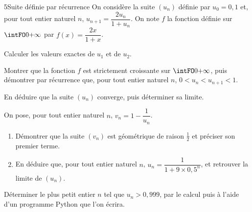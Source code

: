 \begin{exoBac}{5}{Suite définie par récurrence}
On considère la suite $(u_n)$ définie par $u_0=0{,}1$ et, pour tout entier naturel $n$, $u_{n+1}=\dfrac{2u_n}{1+u_n}$. On note $f$ la
fonction définie sur $\intFO0{+\infty}$ par $f(x)=\dfrac{2x}{1+x}$.
\begin{questions}
  \item Calculer les valeurs exactes de $u_1$ et de $u_2$.
  \item Montrer que la fonction $f$ est strictement croissante sur $\intFO0{+\infty}$, puis démontrer par récurrence que, pour tout
    entier naturel $n$, $0<u_n<u_{n+1}<1$.
  \item En déduire que la suite $(u_n)$ converge, puis déterminer sa limite.
  \item On pose, pour tout entier naturel $n$, $v_n=1-\dfrac{1}{u_n}$.
    \begin{enumerate}[label=\alph*),leftmargin=1.4em,itemsep=0.4mm,topsep=0.4mm]
      \item Démontrer que la suite $(v_n)$ est géométrique de raison $\frac12$ et préciser son premier terme.
      \item En déduire que, pour tout entier naturel $n$, $u_n=\dfrac{1}{1+9\times0{,}5^{n}}$, et retrouver la limite de $(u_n)$.
    \end{enumerate}
  \item Déterminer le plus petit entier $n$ tel que $u_n>0{,}999$, par le calcul puis à l'aide d'un programme Python que l'on écrira.
\end{questions}
\end{exoBac}


